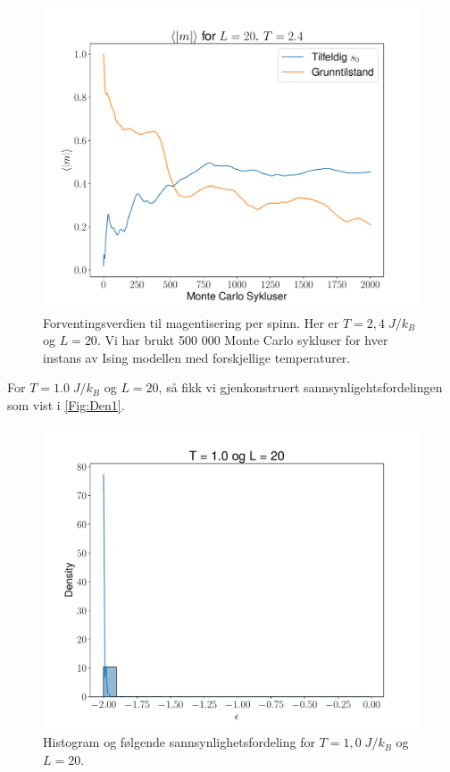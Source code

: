 \documentclass[reprint,english,notitlepage]{revtex4-2}  %
\begin{document}
\begin{figure}[H]
\centering
\includegraphics[scale=0.4, trim=2.5cm 0 0 0 ]{../Images/meanmT24L20.pdf}
\caption{Forventingsverdien til magentisering per spinn. Her er $T=2,4 \; J/k_B$ og $L = 20$. Vi har brukt 500 000 Monte Carlo sykluser for hver instans av Ising modellen med forskjellige temperaturer. }
\label{Fig:5m24}
\end{figure}

For $T = 1.0 \; J/k_B$ og $L = 20$, så fikk vi gjenkonstruert sannsynligehtsfordelingen som vist i \autoref{Fig:Den1}.

\begin{figure}[H]
\centering
\includegraphics[scale=0.4, trim=2.0cm 0 0 0]{../Images/T100L20.pdf}
\caption{Histogram og følgende sannsynlighetsfordeling for $T = 1,0 \; J/k_B$ og $L = 20$.}
\label{Den1}
\end{figure}
\end{document}

